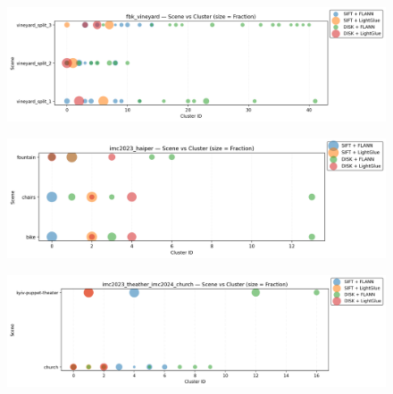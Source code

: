 \documentclass[report.tex]{subfiles}
\begin{document}
    \begin{figure}[H]
        \centering
        
        \begin{minipage}{\textwidth}
        \centering
        \includegraphics[width=\linewidth]{images/scene_cluster_by_dataset/fbk_vineyard.png}
        \label{fig:scene-cluster-A1}
        \end{minipage}\hfill

        \begin{minipage}{\textwidth}
            \centering
            \includegraphics[width=\linewidth]{images/scene_cluster_by_dataset/imc2023_haiper.png}
            \label{fig:scene-cluster-A2}
        \end{minipage}\hfill
    
        \begin{minipage}{\textwidth}
            \centering
            \includegraphics[width=\linewidth]{images/scene_cluster_by_dataset/imc2023_theather_imc2024_church.png}
            \label{fig:scene-cluster-A3}
        \end{minipage}
    \end{figure}
\end{document}

